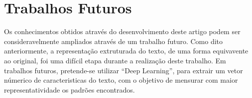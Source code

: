 \section{Trabalhos Futuros}

Os conhecimentos obtidos através do desenvolvimento deste artigo podem ser 
consideravelmente ampliados através de um trabalho futuro. Como dito 
anteriormente, a representação extruturada do texto, de uma forma equivavente ao 
original, foi uma difícil etapa durante a realização deste trabalho. Em 
trabalhos futuros, pretende-se utilizar ``Deep Learning'', para extrair um vetor 
númerico de caracteristicas do texto, com o objetivo de mensurar com maior 
representatividade os padrões encontrados.